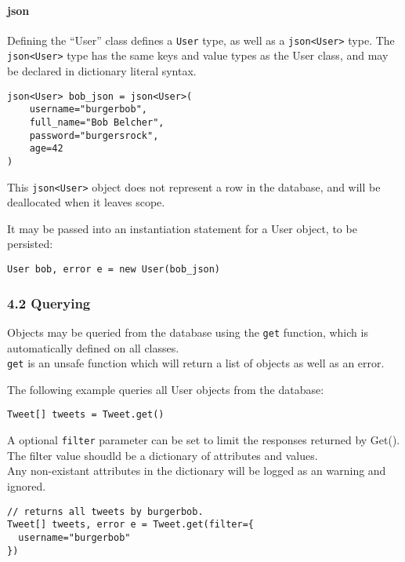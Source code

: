 \documentclass[]{article}
\begin{document}
\paragraph{json}\label{json-1}

Defining the ``User'' class defines a \texttt{User} type, as well as a
\texttt{json\textless{}User\textgreater{}} type. The
\texttt{json\textless{}User\textgreater{}} type has the same keys and
value types as the User class, and may be declared in dictionary literal
syntax.

\begin{verbatim}
json<User> bob_json = json<User>(
    username="burgerbob",
    full_name="Bob Belcher",
    password="burgersrock",
    age=42
)
\end{verbatim}

This \texttt{json\textless{}User\textgreater{}} object does not
represent a row in the database, and will be deallocated when it leaves
scope.

It may be passed into an instantiation statement for a User object, to
be persisted:

\begin{verbatim}
User bob, error e = new User(bob_json)
\end{verbatim}

\subsubsection{4.2 Querying}\label{querying}

Objects may be queried from the database using the \texttt{get}
function, which is automatically defined on all classes.\\\texttt{get}
is an unsafe function which will return a list of objects as well as an
error.

The following example queries all User objects from the database:

\begin{verbatim}
Tweet[] tweets = Tweet.get()
\end{verbatim}

A optional \texttt{filter} parameter can be set to limit the responses
returned by Get().\\The filter value shoudld be a dictionary of
attributes and values.\\Any non-existant attributes in the dictionary
will be logged as an warning and ignored.

\begin{verbatim}
// returns all tweets by burgerbob.
Tweet[] tweets, error e = Tweet.get(filter={
  username="burgerbob"
})
\end{verbatim}
\end{document}
